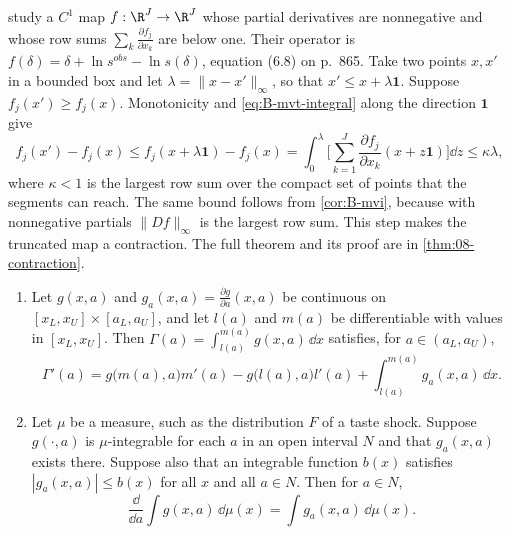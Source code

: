 \begin{example}\label{ex:B-blp-mvt}
\citet[Appendix I, p.~887]{BerryLevinsohnPakes1995} study a $C^1$ map $f : \R^J \to \R^J$ whose partial derivatives
are nonnegative and whose row sums $\sum_k\frac{\partial f_j}{\partial x_k}$ are below one. Their operator is
$f(\delta) = \delta + \ln s^{obs} - \ln s(\delta)$, equation (6.8) on p.~865. Take two points $x, x'$ in a bounded box
and let $\lambda = \|x - x'\|_\infty$, so that $x' \leq x + \lambda\mathbf{1}$. Suppose $f_j(x') \geq f_j(x)$. Monotonicity
and \eqref{eq:B-mvt-integral} along the direction $\mathbf{1}$ give
\begin{equation*}
f_j(x') - f_j(x) \leq f_j(x + \lambda\mathbf{1}) - f_j(x)
= \int_0^\lambda\Big[\sum_{k = 1}^{J}\frac{\partial f_j}{\partial x_k}(x + z\mathbf{1})\Big]\dd z \leq \kappa\lambda ,
\end{equation*}
where $\kappa < 1$ is the largest row sum over the compact set of points that the segments can reach. The same bound
follows from \cref{cor:B-mvi}, because with nonnegative partials $\|Df\|_\infty$ is the largest row sum. This step makes
the truncated map a contraction. The full theorem and its proof are in \cref{thm:08-contraction}.
\end{example}

\begin{proposition}\label{prop:B-leibniz}
\begin{enumerate}[label=(\alph*)]
  \item Let $g(x, a)$ and $g_a(x, a) = \frac{\partial g}{\partial a}(x, a)$ be continuous on
  $[x_L, x_U] \times [a_L, a_U]$, and let $l(a)$ and $m(a)$ be differentiable with values in $[x_L, x_U]$. Then
  $\Gamma(a) = \int_{l(a)}^{m(a)}g(x, a)\,\dd x$ satisfies, for $a \in (a_L, a_U)$,
  \begin{equation}\label{eq:B-leibniz}
  \Gamma'(a) = g\big(m(a), a\big)m'(a) - g\big(l(a), a\big)l'(a) + \int_{l(a)}^{m(a)}g_a(x, a)\,\dd x .
  \end{equation}
  \item Let $\mu$ be a measure, such as the distribution $F$ of a taste shock. Suppose $g(\cdot, a)$ is
  $\mu$-integrable for each $a$ in an open interval $N$ and that $g_a(x, a)$ exists there. Suppose also that an
  integrable function $b(x)$ satisfies $|g_a(x, a)| \leq b(x)$ for all $x$ and all $a \in N$. Then for $a \in N$,
  \begin{equation*}
  \frac{\dd}{\dd a}\int g(x, a)\,\dd\mu(x) = \int g_a(x, a)\,\dd\mu(x) .
  \end{equation*}
\end{enumerate}
\end{proposition}

